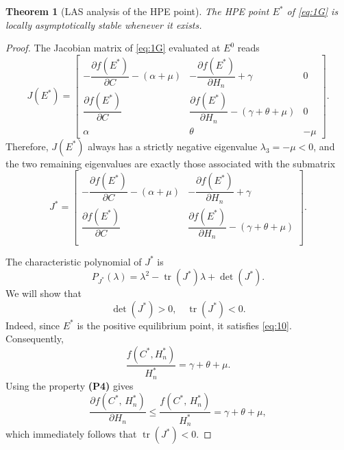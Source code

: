 \documentclass[11pt]{article}
\newtheorem{theorem}{Theorem}[section]
\theoremstyle{definition}
\theoremstyle{remark}
\numberwithin{equation}{section}
\DeclareMathOperator{\trace}{tr}
\begin{document}
\begin{theorem}[LAS analysis of the HPE point]\label{Theorem2}
The HPE point $E^*$ of \eqref{eq:1G} is locally asymptotically stable whenever it exists. 
\end{theorem}
\begin{proof}
The Jacobian matrix of \eqref{eq:1G} evaluated at $E^0$ reads
\begin{equation*}
   J(E^*) = \begin{bmatrix}
   -\dfrac{\partial f(E^*)}{\partial C} - (\alpha + \mu)&-\dfrac{\partial f(E^*)}{\partial H_n} + \gamma&0\\[4pt]
   \dfrac{\partial f(E^*)}{\partial C}& \dfrac{\partial f(E^*)}{\partial H_n} - (\gamma + \theta + \mu)&0\\[4pt]
   \alpha&\theta&-\mu
    \end{bmatrix}.
\end{equation*}
Therefore, $J(E^*)$ always has a strictly negative eigenvalue $\lambda_3 = -\mu < 0$, and the two remaining eigenvalues are exactly those associated with the submatrix
\begin{equation*}
J^* =\begin{bmatrix}
-\dfrac{\partial f(E^*)}{\partial C} - (\alpha + \mu)&-\dfrac{\partial f(E^*)}{\partial H_n} + \gamma\\[4pt]
\dfrac{\partial f(E^*)}{\partial C}& \dfrac{\partial f(E^*)}{\partial H_n} - (\gamma + \theta + \mu)\\
\end{bmatrix}.
\end{equation*}

The characteristic polynomial of $J^*$ is
\begin{equation*}
    P_{J^*}(\lambda) = \lambda^2 - \trace(J^*)\lambda + \det(J^*).
\end{equation*}
We will show that
\begin{equation}\label{eq:16}
   \det(J^*) > 0, \quad \trace(J^*) < 0.
\end{equation}
Indeed, since $E^*$ is the positive equilibrium point, 
it satisfies \eqref{eq:10}. Consequently,
\begin{equation*}
   \dfrac{f(C^*, H_n^*)}{H_n^*} = \gamma + \theta + \mu.
\end{equation*}
Using the property \textbf{(P4)} gives
\begin{equation}\label{eq:17}
   \dfrac{\partial f(C^*,\,H_n^*)}{\partial H_n} \le\dfrac{f(C^*,\,H_n^*)}{H_n^*} = \gamma + \theta + \mu,
\end{equation}
which immediately follows that $\trace(J^*) < 0$.


\end{proof}
\end{document}
